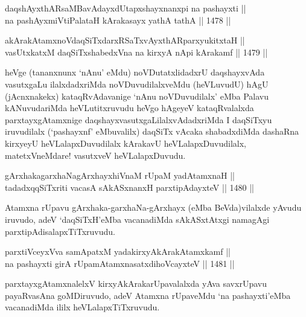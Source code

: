 \begin{shl}
daqshAyxthARsaMBavAdayxdUtapxshayxnanxpi na pashayxti ||  \\
na pashAyxmiVtiPalataH kArakasayx yathA tathA ||  1478 ||  
\end{shl}
				
\begin{shl}
akArakAtamxnoV\s daqSiTxdarxRSaTxvAyxthARparxyukitxtaH || \\
vasUtxkatxM daqSiTxshabedxVna na kirxyA nApi kArakamf ||  1479 ||  
\end{shl}

\begin{artha}
heVge (tananxnunx `nAnu' eMdu) noVDutatxlidadxrU daqshayxvAda vasutxgaLu ilalxdadxriMda noVDuvudilalxveMdu (heVLuvudU) hAgU (jAcnxnakekx) kataqRvAdavanige `nAnu noVDuvudilalx' eMba Palavu kANuvudariMda heVLutitxruvudu heVgo hAgeyeV kataqRvalalxda parxtayxgAtamxnige daqshayxvasutxgaLilalxvAdadxriMda I daqSiTxyu iruvudilalx (`pashayxnf' eMbuvalilx) daqSiTx vAcaka shabadxdiMda dashaRna kirxyeyU heVLalapxDuvudilalx kArakavU heVLalapxDuvudilalx, matetxVneMdare! vasutxveV heVLalapxDuvudu.
\end{artha}


\begin{shl}
gArxhakagarxhaNagArxhayxhiVnaM rUpaM yadAtamxnaH || \\
tadadxqqSiTxriti vacasA sAkASxnanxH parxtipAdayxteV ||  1480 ||  
\end{shl}

\begin{artha}
Atamxna rUpavu gArxhaka-garxhaNa-gArxhayx (eMba BeVda)vilalxde yAvudu iruvudo, adeV `daqSiTxH'eMba vacanadiMda sAkASxtAtxgi namagAgi parxtipAdisalapxTiTxruvudu.
\end{artha}


\begin{shl}
parxtiVceyxVva samApatxM yadakirxyAkArakAtamxkamf || \\
na pashayxti girA rUpamAtamxnasatxdihoVcayxteV ||  1481 ||  
\end{shl}

\begin{artha}
parxtayxgAtamxnalelxV kirxyAkArakarUpavalalxda yAva savxrUpavu payaRvasAna goMDiruvudo, adeV Atamxna rUpaveMdu `na pashayxti'eMba vacanadiMda ililx heVLalapxTiTxruvudu.
\end{artha}

